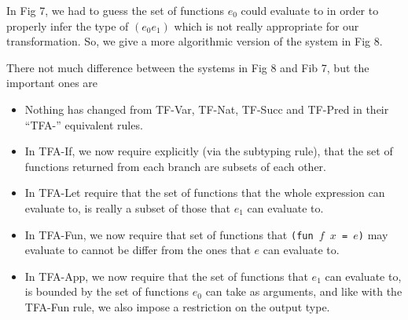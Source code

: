 In Fig 7, we had to guess the set of functions $e_0$ could evaluate to
in order to properly infer the type of $(e_0 e_1)$ which is not really
appropriate for our transformation.
So, we give a more algorithmic version 
of the system in Fig 8.

There not much difference between the systems in Fig 8 and Fib 7,
but the important ones are
\begin{itemize}
  \item Nothing has changed from TF-Var, TF-Nat, TF-Succ and TF-Pred
    in their ``TFA-'' equivalent rules.
  \item In TFA-If, we now require explicitly (via the subtyping rule),
    that the set of functions returned from each branch are subsets of each other.
  \item In TFA-Let require that the set of functions that the whole expression
    can evaluate to, is really a subset of those that $e_1$ can evaluate to.
  \item In TFA-Fun, we now require that set of functions that {\tt (fun $f$ $x$ = $e$)}
    may evaluate to cannot be differ from the ones that $e$ can evaluate to.
  \item In TFA-App, we now require that the set of functions that $e_1$ can evaluate
    to, is bounded by the set of functions $e_0$ can take as arguments,
    and like with the TFA-Fun rule, we also impose a restriction on the output type.
\end{itemize}

